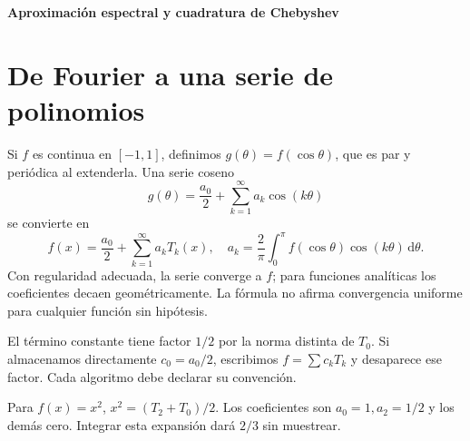 \documentclass[11pt,a4paper]{article}
\newcommand{\dd}{\,\mathrm d}
\theoremstyle{definition}
\newcommand{\parte}[1]{\par\bigskip\Needspace{8\baselineskip}\begin{center}{\Large\bfseries\color{azul}#1}\end{center}}
\begin{document}
\parte{Aproximación espectral y cuadratura de Chebyshev}
\section{De Fourier a una serie de polinomios}
Si $f$ es continua en $[-1,1]$, definimos $g(\theta)=f(\cos\theta)$, que es par y periódica al extenderla. Una serie coseno
\[
g(\theta)=\frac{a_0}2+\sum_{k=1}^\infty a_k\cos(k\theta)
\]
se convierte en
\[
f(x)=\frac{a_0}2+\sum_{k=1}^\infty a_kT_k(x),\quad
a_k=\frac2\pi\int_0^\pi f(\cos\theta)\cos(k\theta)\dd\theta.
\]
Con regularidad adecuada, la serie converge a $f$; para funciones analíticas los coeficientes decaen geométricamente. La fórmula no afirma convergencia uniforme para cualquier función sin hipótesis.

El término constante tiene factor $1/2$ por la norma distinta de $T_0$. Si almacenamos directamente $c_0=a_0/2$, escribimos $f=\sum c_kT_k$ y desaparece ese factor. Cada algoritmo debe declarar su convención.

Para $f(x)=x^2$, $x^2=(T_2+T_0)/2$. Los coeficientes son $a_0=1,a_2=1/2$ y los demás cero. Integrar esta expansión dará $2/3$ sin muestrear.
\end{document}
